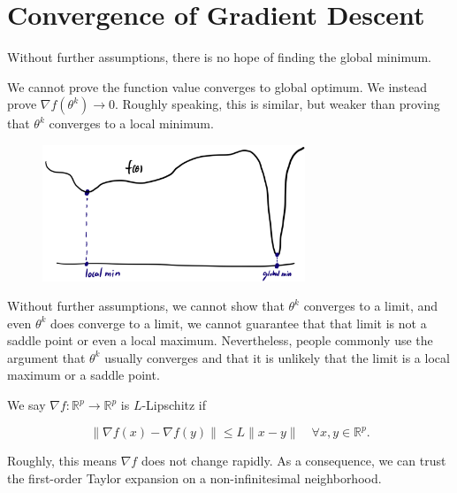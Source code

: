 \documentclass{report}
\begin{document}
\section{Convergence of Gradient Descent}

Without further assumptions, there is no hope of finding the global minimum.

We cannot prove the function value converges to global optimum. We instead prove $\nabla f\left(\theta^{k}\right) \rightarrow 0$. Roughly speaking, this is similar, but weaker than proving that $\theta^{k}$ converges to a local minimum.

\begin{figure}[H]
    \centering
    \includegraphics[width=0.7\textwidth]{.././assets/2.2.png}
\end{figure}

Without further assumptions, we cannot show that $\theta^{k}$ converges to a limit, and even $\theta^{k}$ does converge to a limit, we cannot guarantee that that limit is not a saddle point or even a local maximum. Nevertheless, people commonly use the argument that $\theta^{k}$ usually converges and that it is unlikely that the limit is a local maximum or a saddle point.

\begin{definition}[2.3][$L$-Lipschitz]
    We say $\nabla f: \mathbb{R}^{p} \rightarrow \mathbb{R}^{p}$ is $L$-Lipschitz if

    $$
    \|\nabla f(x)-\nabla f(y)\| \leq L\|x-y\| \quad \forall x, y \in \mathbb{R}^{p} .
    $$

    Roughly, this means $\nabla f$ does not change rapidly. As a consequence, we can trust the first-order Taylor expansion on a non-infinitesimal neighborhood.
\end{definition}
\end{document}
